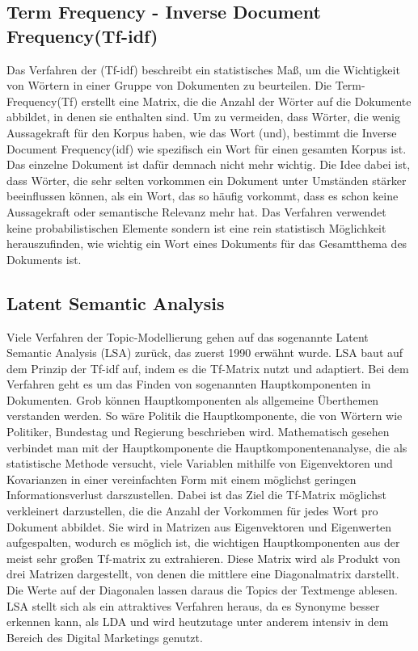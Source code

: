 \documentclass[german,version-2020-11]{uzl-thesis}
\begin{document}
\subsection{Term Frequency - Inverse Document Frequency(Tf-idf)}
Das Verfahren der (Tf-idf) beschreibt ein statistisches Maß, um die Wichtigkeit von Wörtern in einer Gruppe von Dokumenten zu beurteilen. Die Term-Frequency(Tf) erstellt eine Matrix, die die Anzahl der Wörter auf die Dokumente abbildet, in denen sie enthalten sind. Um zu vermeiden, dass Wörter, die wenig Aussagekraft für den Korpus haben, wie das Wort (und), bestimmt die Inverse Document Frequency(idf) wie spezifisch ein Wort für einen gesamten Korpus ist. Das einzelne Dokument ist dafür demnach nicht mehr wichtig. Die Idee dabei ist, dass Wörter, die sehr selten vorkommen ein Dokument unter Umständen stärker beeinflussen können, als ein Wort, das so häufig vorkommt, dass es schon keine Aussagekraft oder semantische Relevanz mehr hat. Das Verfahren verwendet keine probabilistischen Elemente sondern ist eine rein statistisch Möglichkeit herauszufinden, wie wichtig ein Wort eines Dokuments für das Gesamtthema des Dokuments ist. 

\subsection{Latent Semantic Analysis}
Viele Verfahren der Topic-Modellierung gehen auf das sogenannte Latent Semantic Analysis (LSA) zurück, das zuerst 1990 erwähnt wurde. LSA baut auf dem Prinzip der Tf-idf auf, indem es die Tf-Matrix nutzt und adaptiert. Bei dem Verfahren geht es um das Finden von sogenannten Hauptkomponenten in Dokumenten. Grob können Hauptkomponenten als allgemeine Überthemen verstanden werden. So wäre Politik die Hauptkomponente, die von Wörtern wie Politiker, Bundestag und Regierung beschrieben wird. Mathematisch gesehen verbindet man mit der Hauptkomponente die Hauptkomponentenanalyse, die als statistische Methode versucht, viele Variablen mithilfe von Eigenvektoren und Kovarianzen in einer vereinfachten Form mit einem möglichst geringen Informationsverlust darszustellen. Dabei ist das Ziel die Tf-Matrix möglichst verkleinert darzustellen, die die Anzahl der Vorkommen für jedes Wort pro Dokument abbildet. Sie wird in Matrizen aus Eigenvektoren und Eigenwerten aufgespalten, wodurch es möglich ist, die wichtigen Hauptkomponenten aus der meist sehr großen Tf-matrix zu extrahieren. Diese Matrix wird als Produkt von drei Matrizen dargestellt, von denen die mittlere eine Diagonalmatrix darstellt. Die Werte auf der Diagonalen lassen daraus die Topics der Textmenge ablesen. LSA stellt sich als ein attraktives Verfahren heraus, da es Synonyme besser erkennen kann, als LDA und wird heutzutage unter anderem intensiv in dem Bereich des Digital Marketings genutzt. 
\end{document}
